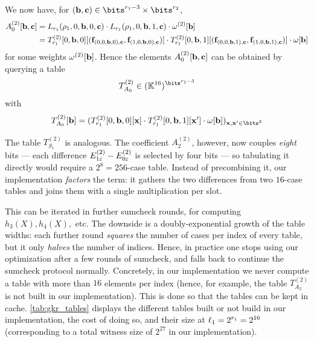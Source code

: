 \documentclass[11pt,letterpaper,usenames,dvipsnames]{article}
\begin{document}
We now have, for $(\bb,\cc)\in \bits^{r_1-3}\times \bits^{r_2}$, 
 \begin{align*}A_0^{(2)}[\mathbf{b},\mathbf{c}] &= L_{r_1}(\rho_1,0,\mathbf{b},0,\mathbf{c})\cdot L_{r_1}(\rho_1,0,\mathbf{b},1,\mathbf{c})\cdot\omega^{(2)}[\mathbf{b}]\\ &= 
    T_{r_1}^{(2)}[0,\mathbf{b},0][(\mathbf{f}_{(0,0,\mathbf{b},0),\mathbf{c}},\mathbf{f}_{(1,0,\mathbf{b},0),\mathbf{c}})] \cdot    T_{r_1}^{(2)}[0,\mathbf{b}, 1][(\mathbf{f}_{(0,0,\mathbf{b},1),\mathbf{c}}, \mathbf{f}_{(1,0,\mathbf{b},1),\mathbf{c}})] \cdot \omega[\mathbf{b}]
\end{align*}
%
for some weights $\omega^{(2)}[\mathbf{b}]$.
%
Hence the elements $A_0^{(2)}[\mathbf{b},\mathbf{c}]$ can be obtained by querying a table $$T_{A_0}^{(2)}\in (\KK^{16})^{\bits^{r_1-3}}$$ with
%
$$T_{A_0}^{(2)}[\bb]= (T_{r_1}^{(2)}[0,\bb,0][\xx]\cdot T_{r_1}^{(2)}[0,\bb,1][\xx']\cdot \omega[\bb])_{\xx,\xx'\in \bits^{2}}$$


The  table $T_{S_1}^{(2)}$ is analogous. The coefficient $A_2^{(2)}$, however, now couples \emph{eight} bits --- each difference $E_{1\varepsilon}^{(2)}-E_{0\varepsilon}^{(2)}$ is selected by four bits --- so tabulating it directly would require a $2^8=256$-case table. Instead of precombining it, our implementation \emph{factors} the term: it gathers the two differences from two $16$-case tables and joins them with a single multiplication per slot.

This can be iterated in further sumcheck rounds, for computing $h_3(X), h_4(X),$ etc. The downside is a doubly-exponential growth of the table widths: each further round \emph{squares} the number of cases per index of every table, but it only \emph{halves} the number of indices.
Hence, in practice one stops using our optimization after a few rounds of sumcheck, and falls back to continue the sumcheck protocol normally. Concretely, in our implementation we never compute a table with more than $16$ elements per index (hence, for example, the table $T_{A_2}^{(2)}$ is not built in our implementation). This is done so that the tables can be kept in cache.     \cref{tab:gkr_tables} displays the different tables built or not build in our implementation, the cost of doing so, and their size at $\ell_1=2^{r_1}=2^{16}$ (corresponding to a total witness size of $2^{27}$ in our implementation).
\end{document}
